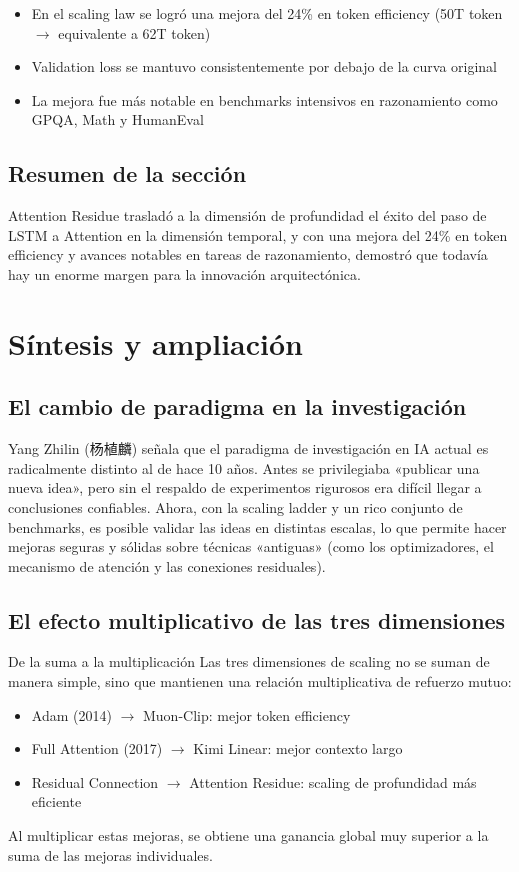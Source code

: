 \documentclass[a4paper]{article}
\begin{document}
\begin{itemize}
    \item En el scaling law se logró una mejora del 24\% en token efficiency (50T token $\rightarrow$ equivalente a 62T token)
    \item Validation loss se mantuvo consistentemente por debajo de la curva original
    \item La mejora fue más notable en benchmarks intensivos en razonamiento como GPQA, Math y HumanEval
\end{itemize}

\subsection{Resumen de la sección}

Attention Residue trasladó a la dimensión de profundidad el éxito del paso de LSTM a Attention en la dimensión temporal, y con una mejora del 24\% en token efficiency y avances notables en tareas de razonamiento, demostró que todavía hay un enorme margen para la innovación arquitectónica.

\section{Síntesis y ampliación}

\subsection{El cambio de paradigma en la investigación}

Yang Zhilin (杨植麟) señala que el paradigma de investigación en IA actual es radicalmente distinto al de hace 10 años. Antes se privilegiaba «publicar una nueva idea», pero sin el respaldo de experimentos rigurosos era difícil llegar a conclusiones confiables. Ahora, con la scaling ladder y un rico conjunto de benchmarks, es posible validar las ideas en distintas escalas, lo que permite hacer mejoras seguras y sólidas sobre técnicas «antiguas» (como los optimizadores, el mecanismo de atención y las conexiones residuales).

\subsection{El efecto multiplicativo de las tres dimensiones}

\begin{importantbox}{De la suma a la multiplicación}
Las tres dimensiones de scaling no se suman de manera simple, sino que mantienen una relación multiplicativa de refuerzo mutuo:
\begin{itemize}
    \item Adam (2014) $\rightarrow$ Muon-Clip: mejor token efficiency
    \item Full Attention (2017) $\rightarrow$ Kimi Linear: mejor contexto largo
    \item Residual Connection $\rightarrow$ Attention Residue: scaling de profundidad más eficiente
\end{itemize}
Al multiplicar estas mejoras, se obtiene una ganancia global muy superior a la suma de las mejoras individuales.
\end{importantbox}
\end{document}
